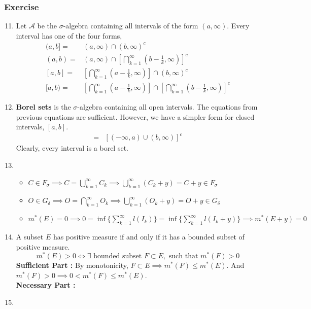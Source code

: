 \subsubsection{Exercise}
\begin{enumerate}
	\setcounter{enumi}{10}
	\item Let $\mathcal{A}$ be the $\sigma$-algebra containing all intervals of the form $(a, \infty)$.
		Every interval has one of the four forms,
	\begin{align}
		(a,b] = & (a,\infty) \cap (b,\infty)^c \\
		(a,b) = & (a,\infty) \cap \left[\bigcap_{k=1}^\infty \left(b-\frac{1}{k},\infty\right)\right]^c \\
		[a,b] = & \left[ \bigcap_{k=1}^\infty \left(a-\frac{1}{k},\infty\right)\right] \cap (b,\infty)^c \\
		[a,b) = & \left[\bigcap_{k=1}^\infty \left(a-\frac{1}{k},\infty\right)\right] \cap \left[ \bigcap_{k=1}^\infty \left(b-\frac{1}{k},\infty\right)\right]^c
	\end{align}
\item \textbf{Borel sets} is the $\sigma$-algebra containing all open intervals.
	The equations from previous equations are sufficient.
	However, we have a simpler form for closed intervals, $[a,b]$.
	\begin{align}
		[a,b] = & \left[(-\infty,a) \cup (b,\infty) \right]^c 
	\end{align}
		Clearly, every interval is a borel set.
	\item
	\begin{itemize}
		\item $C \in F_\sigma \implies C = \bigcup_{k=1}^\infty C_k \implies \bigcup_{k=1}^\infty \left(C_k+y\right) = C+y \in F_\sigma$
		\item $O \in G_\delta \implies O = \bigcap_{k=1}^\infty O_k \implies \bigcup_{k=1}^\infty \left( O_k+y \right) =  O+y \in G_\delta$
		\item $m^\ast(E) = 0 \implies 0 = \inf\{\sum_{k=1}^\infty l(I_k)\} = \inf\{\sum_{k=1}^\infty l(I_k+y)\} \implies  m^\ast(E+y) = 0$
	\end{itemize}
	\item A subset $E$ has positive measure if and only if it has a bounded subset of positive measure.
		$$m^\ast(E) > 0 \iff \exists \text{ bounded subset }F \subset E,\text{ such that } m^\ast(F) > 0$$
		\textbf{Sufficient Part :} By monotonicity, $F \subset E \implies m^\ast(F) \le m^\ast(E)$.
		And $m^\ast(F) > 0 \implies 0 < m^\ast(F) \le m^\ast(E)$.\\
		\textbf{Necessary Part :}
	\item 
\end{enumerate}

